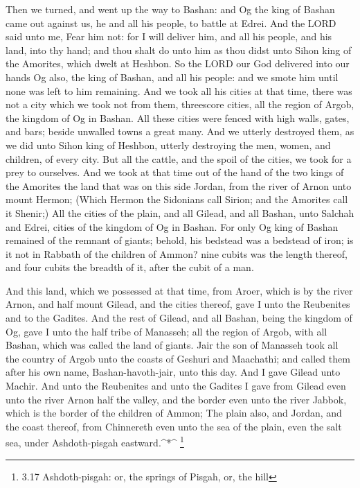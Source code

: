  Then we turned, and went up the way to Bashan: and Og the
king of Bashan came out against us, he and all his people, to battle at
Edrei.  And the LORD said unto me, Fear him not: for I will
deliver him, and all his people, and his land, into thy hand; and thou
shalt do unto him as thou didst unto Sihon king of the Amorites, which
dwelt at Heshbon.  So the LORD our God delivered into our
hands Og also, the king of Bashan, and all his people: and we smote him
until none was left to him remaining.  And we took all his
cities at that time, there was not a city which we took not from them,
threescore cities, all the region of Argob, the kingdom of Og in Bashan.
 All these cities were fenced with high walls, gates, and
bars; beside unwalled towns a great many.  And we utterly
destroyed them, as we did unto Sihon king of Heshbon, utterly destroying
the men, women, and children, of every city.  But all the
cattle, and the spoil of the cities, we took for a prey to ourselves.
 And we took at that time out of the hand of the two kings
of the Amorites the land that was on this side Jordan, from the river of
Arnon unto mount Hermon;  (Which Hermon the Sidonians call
Sirion; and the Amorites call it Shenir;)  All the cities
of the plain, and all Gilead, and all Bashan, unto Salchah and Edrei,
cities of the kingdom of Og in Bashan.  For only Og king of
Bashan remained of the remnant of giants; behold, his bedstead was a
bedstead of iron; is it not in Rabbath of the children of Ammon? nine
cubits was the length thereof, and four cubits the breadth of it, after
the cubit of a man.

 And this land, which we possessed at that time, from
Aroer, which is by the river Arnon, and half mount Gilead, and the
cities thereof, gave I unto the Reubenites and to the Gadites.
 And the rest of Gilead, and all Bashan, being the kingdom
of Og, gave I unto the half tribe of Manasseh; all the region of Argob,
with all Bashan, which was called the land of giants.  Jair
the son of Manasseh took all the country of Argob unto the coasts of
Geshuri and Maachathi; and called them after his own name,
Bashan-havoth-jair, unto this day.  And I gave Gilead unto
Machir.  And unto the Reubenites and unto the Gadites I
gave from Gilead even unto the river Arnon half the valley, and the
border even unto the river Jabbok, which is the border of the children
of Ammon;  The plain also, and Jordan, and the coast
thereof, from Chinnereth even unto the sea of the plain, even the salt
sea, under Ashdoth-pisgah eastward.\^{}*\^{} \footnote{3.17
  Ashdoth-pisgah: or, the springs of Pisgah, or, the hill}

